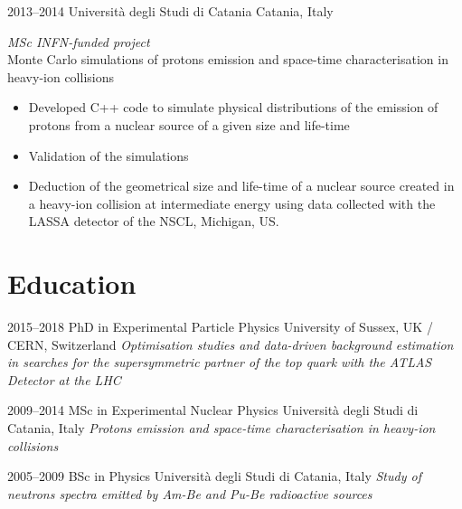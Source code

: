 \documentclass[print]{cv} %
\begin{document}
  \begin{entrylist}
    \entry
    {2013--2014}
    {Università degli Studi di Catania}
    {Catania, Italy}
    {\emph{MSc INFN-funded project}\\
    Monte Carlo simulations of protons emission and space-time characterisation in heavy-ion collisions
    \begin{itemize}
      \item Developed C++ code to simulate physical distributions of the emission of protons from a nuclear source of a given size and life-time
      \item Validation of the simulations
      \item Deduction of the geometrical size and life-time of a nuclear source created in a heavy-ion collision at intermediate energy using data collected with the LASSA detector of the NSCL, Michigan, US.
    \end{itemize}
    }
  \end{entrylist}

\section{Education}

\begin{entrylist}
  \entry
      {2015--2018}
      {PhD {\normalfont in Experimental Particle Physics}}
      {University of Sussex, UK / CERN, Switzerland}
      {\emph{Optimisation studies and data-driven background estimation in searches for the 
      supersymmetric partner of the top quark with the ATLAS Detector at the LHC}
      }

  \entry
      {2009--2014}
      {MSc {\normalfont in Experimental Nuclear Physics}}
      {Università degli Studi di Catania, Italy}
      {\emph{Protons emission and space-time characterisation in heavy-ion collisions} }

  \entry
      {2005--2009}
      {BSc {\normalfont in Physics}}
      {Università degli Studi di Catania, Italy}
      {\emph{Study of neutrons spectra emitted by Am-Be and Pu-Be radioactive sources}}
\end{entrylist}
\end{document}
